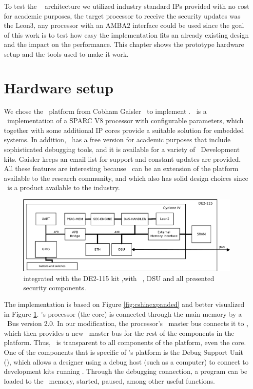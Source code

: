 To test the \cshia~ architecture  we utilized industry standard IPs provided with no cost for academic purposes, the target processor to receive the security updates was the Leon3, any processor with an AMBA2 interface  could be used since the goal of this work is to test how easy the implementation fits an already existing design and  the impact on the performance. This chapter shows the prototype hardware setup and the tools used to make it work. 

\section{Hardware setup}
\label{sec:hardware_setup}

We chose the \leon~platform from Cobham Gaisler~\cite{Leon} to implement \cshia. \leon~is a \vhdl~implementation of a SPARC V8 processor with configurable parameters, which together with some additional IP cores provide a suitable solution for embedded systems. In addition, \leon~has a free version for academic purposes that include sophisticated debugging tools, and it is available for a variety of \fpga~Development kits. Gaisler keeps an email list for support and constant updates are provided. All these features are interesting because \cshia~can be an extension of the platform available to the research community, and which also has solid design choices since \leon~is a product available to the industry.

 \begin{figure}[!ht]
    \centering
    \includegraphics[width=1\textwidth]{figures/pdf/leon_amba_new.pdf}
    \caption{\cshia integrated with the DE2-115 kit ,with \leon~, DSU and all presented security components. }
    \label{fig:leoninamba}
\end{figure}

The implementation is based on Figure \ref{fig:cshiaexpanded} and better visualized in Figure \ref{fig:leoninamba}. \leon's processor (the core) is connected through the main memory by a \amba~Bus version 2.0. In our modification, the processor's \io~master bus connects it to \handler, which then provides a new \io~master bus for the rest of the components in the platform. Thus, \handler~is transparent to all components of the platform, even the core. One of the components that is specific of \leon's platform is the Debug Support Unit (\dsu), which allows a designer using a debug host (such as a computer) to connect to development kits running \leon. Through the debugging connection, a program can be loaded to the \fpga~memory, started, paused, among other useful functions.

